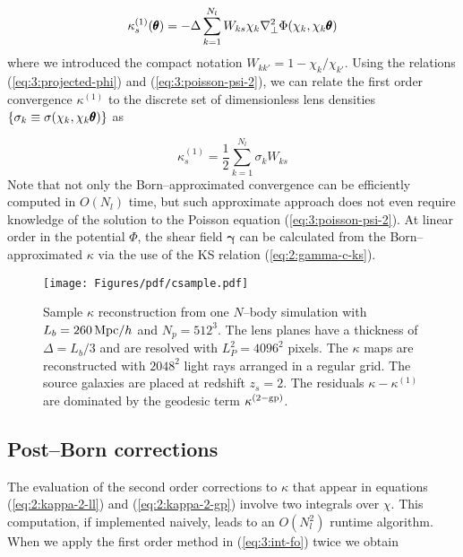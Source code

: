 \begin{equation}
\label{eq:3:kappa-fo-num-1}
\kappa^{(1)}_s(\pmb{\theta}) = -\Delta\sum_{k=1}^{N_l} W_{ks}\chi_k\nabla^2_\perp\Phi(\chi_k,\chi_k\pmb{\theta})
\end{equation} 
%
where we introduced the compact notation $W_{kk'}=1-\chi_k/\chi_{k'}$. Using the relations (\ref{eq:3:projected-phi}) and (\ref{eq:3:poisson-psi-2}), we can relate the first order convergence $\kappa^{(1)}$ to the discrete set of dimensionless lens densities $\{\sigma_k\equiv\sigma(\chi_k,\chi_k\pmb{\theta})\}$ as

\begin{equation}
\label{eq:3:kappa-fo-num-2}
\kappa^{(1)}_s = \frac{1}{2}\sum_{k=1}^{N_l} \sigma_k W_{ks}
\end{equation}
%
Note that not only the Born--approximated convergence can be efficiently computed in $O(N_l)$ time, but such approximate approach does not even require knowledge of the solution to the Poisson equation (\ref{eq:3:poisson-psi-2}). At linear order in the potential $\Phi$, the shear field $\pmb{\gamma}$ can be calculated from the Born--approximated $\kappa$ via the use of the KS relation (\ref{eq:2:gamma-c-ks}).  

\begin{figure}
\begin{center}
\texttt{[image: Figures/pdf/csample.pdf]}
\end{center}
\caption{Sample $\kappa$ reconstruction from one $N$--body simulation with $L_b=260\,{\rm Mpc}/h$ and $N_p=512^3$. The lens planes have a thickness of $\Delta=L_b/3$ and are resolved with $L_P^2=4096^2$ pixels. The $\kappa$ maps are reconstructed with $2048^2$ light rays arranged in a regular grid. The source galaxies are placed at redshift $z_s=2$. The residuals $\kappa-\kappa^{(1)}$ are dominated by the geodesic term $\kappa^{(2-{\rm gp})}$.}
\label{fig:3:csample}
\end{figure}

\subsection{Post--Born corrections}
The evaluation of the second order corrections to $\kappa$ that appear in equations (\ref{eq:2:kappa-2-ll}) and (\ref{eq:2:kappa-2-gp}) involve two integrals over $\chi$. This computation, if implemented naively, leads to an $O(N_l^2)$ runtime algorithm. When we apply the first order method in (\ref{eq:3:int-fo}) twice we obtain

